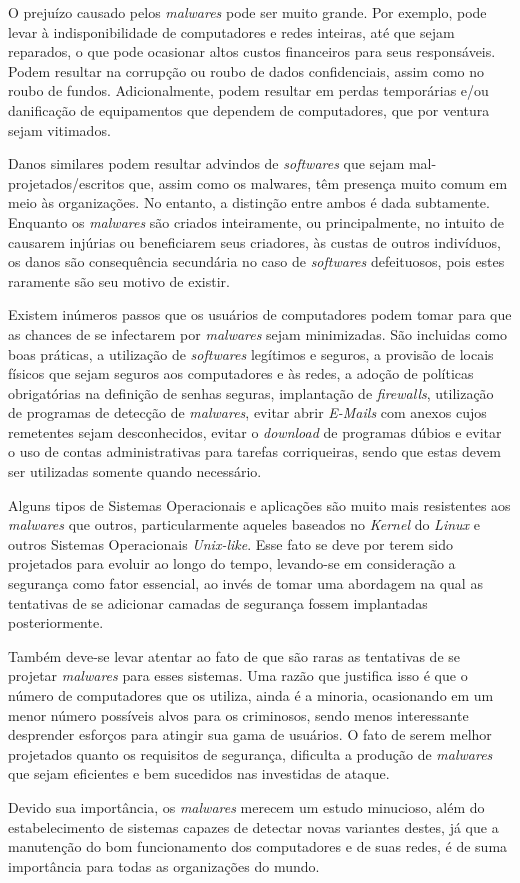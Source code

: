 O prejuízo causado pelos \textit{malwares} pode ser muito grande. Por exemplo, pode levar à indisponibilidade de computadores e redes inteiras, até que sejam reparados, o que pode ocasionar altos custos financeiros para seus responsáveis. Podem resultar na corrupção ou roubo de dados confidenciais, assim como no roubo de fundos. Adicionalmente, podem resultar em perdas temporárias e/ou danificação de equipamentos que dependem de computadores, que por ventura sejam vitimados.

Danos similares podem resultar advindos de \textit{softwares} que sejam mal-projetados/escritos que, assim como os malwares, têm presença muito comum em meio às organizações. No entanto, a distinção entre ambos é dada subtamente. Enquanto os \textit{malwares} são criados inteiramente, ou principalmente, no intuito de causarem injúrias ou beneficiarem seus criadores, às custas de outros indivíduos, os danos são consequência secundária no caso de \textit{softwares} defeituosos, pois estes raramente são seu motivo de existir.

Existem inúmeros passos que os usuários de computadores podem tomar para que as chances de se infectarem por \textit{malwares} sejam minimizadas. São incluidas como boas práticas, a utilização de \textit{softwares} legítimos e seguros, a provisão de locais físicos que sejam seguros aos computadores e às redes, a adoção de políticas obrigatórias na definição de senhas seguras, implantação de \textit{firewalls}, utilização de programas de detecção de \textit{malwares}, evitar abrir \textit{E-Mails} com anexos cujos remetentes sejam desconhecidos, evitar o \textit{download} de programas dúbios e evitar o uso de contas administrativas para tarefas corriqueiras, sendo que  estas devem ser utilizadas somente quando necessário.

Alguns tipos de Sistemas Operacionais e aplicações são muito mais resistentes aos \textit{malwares} que outros, particularmente aqueles baseados no \textit{Kernel} do \textit{Linux} e outros Sistemas Operacionais \textit{Unix-like}. Esse fato se deve por terem sido projetados para evoluir ao longo do tempo, levando-se em consideração a segurança como fator essencial, ao invés de tomar uma abordagem na qual as tentativas de se adicionar camadas de segurança fossem implantadas posteriormente.

Também deve-se levar atentar ao fato de que são raras as tentativas de se projetar \textit{malwares} para esses sistemas. Uma razão que justifica isso é que o número de computadores que os utiliza, ainda é a minoria, ocasionando em um menor número possíveis alvos para os criminosos, sendo menos interessante desprender esforços para atingir sua gama de usuários. O fato de serem melhor projetados quanto os requisitos de segurança, dificulta a produção de \textit{malwares} que sejam eficientes e bem sucedidos nas investidas de ataque.

Devido sua importância, os \textit{malwares} merecem um estudo minucioso, além do estabelecimento de sistemas capazes de detectar novas variantes destes, já que a manutenção do bom funcionamento dos computadores e de suas redes, é de suma importância para todas as organizações do mundo.
